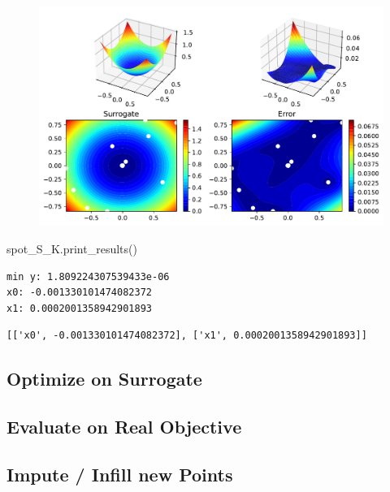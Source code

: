 \documentclass[
  letterpaper,
  DIV=11,
  numbers=noendperiod]{scrreprt}
\newenvironment{Shaded}{\begin{snugshade}}{\end{snugshade}}
\newcommand{\NormalTok}[1]{\textcolor[rgb]{0.00,0.23,0.31}{#1}}
\begin{document}
\begin{figure}[H]

{\centering \includegraphics{012_num_spot_ei_files/figure-pdf/cell-41-output-1.pdf}

}

\end{figure}

\begin{Shaded}
\begin{Highlighting}[]
\NormalTok{spot\_S\_K.print\_results()}
\end{Highlighting}
\end{Shaded}

\begin{verbatim}
min y: 1.809224307539433e-06
x0: -0.001330101474082372
x1: 0.0002001358942901893
\end{verbatim}

\begin{verbatim}
[['x0', -0.001330101474082372], ['x1', 0.0002001358942901893]]
\end{verbatim}

\hypertarget{optimize-on-surrogate}{%
\subsection{Optimize on Surrogate}\label{optimize-on-surrogate}}

\hypertarget{evaluate-on-real-objective}{%
\subsection{Evaluate on Real
Objective}\label{evaluate-on-real-objective}}

\hypertarget{impute-infill-new-points}{%
\subsection{Impute / Infill new Points}\label{impute-infill-new-points}}
\end{document}
